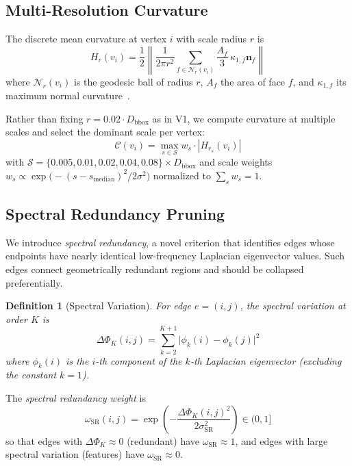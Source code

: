 \documentclass[10pt, twocolumn, a4paper]{article}
\newtheorem{definition}[theorem]{Definition}
\newcommand{\vect}[1]{\bm{#1}}
\begin{document}
\subsection{Multi-Resolution Curvature}
\label{sec:multires}

The discrete mean curvature at vertex $i$ with scale radius $r$ is
\begin{equation}
  \label{eq:curvature}
  H_r(v_i) = \frac{1}{2} \left\| \frac{1}{2\pi r^2}
  \sum_{f \in \mathcal{N}_r(v_i)} \frac{A_f}{3} \,
  \kappa_{1,f} \vect{n}_f \right\|
\end{equation}
where $\mathcal{N}_r(v_i)$ is the geodesic ball of radius $r$,
$A_f$ the area of face $f$, and $\kappa_{1,f}$ its maximum normal
curvature~\cite{cohensteiner2003restricted}.

Rather than fixing $r = 0.02 \cdot D_{\text{bbox}}$ as in V1, we
compute curvature at multiple scales and select the dominant scale
per vertex:
\begin{equation}
  \label{eq:autoscale}
  \mathcal{C}(v_i) = \max_{s \in \mathcal{S}} w_s \cdot |H_{r_s}(v_i)|
\end{equation}
with $\mathcal{S} = \{0.005, 0.01, 0.02, 0.04, 0.08\} \times
D_{\text{bbox}}$ and scale weights
$w_s \propto \exp\big(-(s - s_{\text{median}})^2 / 2\sigma^2\big)$
normalized to $\sum_s w_s = 1$.

\subsection{Spectral Redundancy Pruning}
\label{sec:srp}

We introduce \emph{spectral redundancy}, a novel criterion that
identifies edges whose endpoints have nearly identical low-frequency
Laplacian eigenvector values. Such edges connect geometrically
redundant regions and should be collapsed preferentially.

\begin{definition}[Spectral Variation]
For edge $e = (i,j)$, the spectral variation at order $K$ is
\begin{equation}
  \label{eq:specvar}
  \Delta\Phi_K(i,j) = \sum_{k=2}^{K+1} \big|\phi_k(i) - \phi_k(j)\big|^2
\end{equation}
where $\phi_k(i)$ is the $i$-th component of the $k$-th
Laplacian eigenvector (excluding the constant $k=1$).
\end{definition}

The \emph{spectral redundancy weight} is
\begin{equation}
  \label{eq:specweight}
  \omega_{\text{SR}}(i,j) = \exp\!\left(
    -\frac{\Delta\Phi_K(i,j)^2}{2\sigma_{\text{SR}}^2}
  \right) \in (0, 1]
\end{equation}
so that edges with $\Delta\Phi_K \approx 0$ (redundant) have
$\omega_{\text{SR}} \approx 1$, and edges with large spectral
variation (features) have $\omega_{\text{SR}} \approx 0$.
\end{document}
